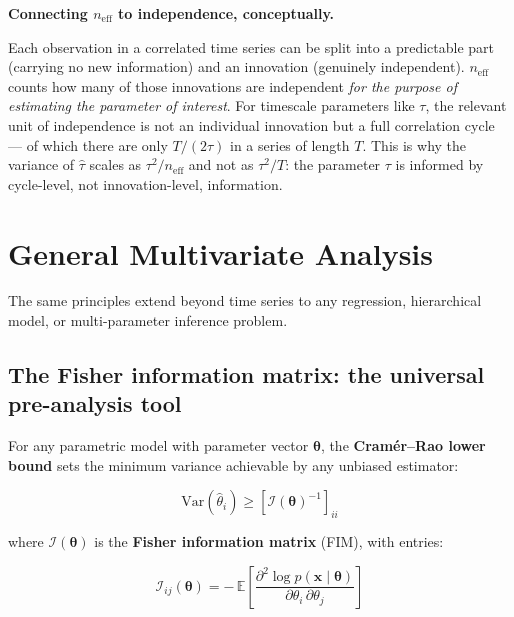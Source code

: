 \documentclass[11pt, a4paper]{article}
\begin{document}
\begin{keybox}
\textbf{Connecting $n_\mathrm{eff}$ to independence, conceptually.}

\smallskip
Each observation in a correlated time series can be split into a predictable part
(carrying no new information) and an innovation (genuinely independent).
$n_\mathrm{eff}$ counts how many of those innovations are independent \emph{for the
purpose of estimating the parameter of interest}.
For timescale parameters like $\tau$, the relevant unit of independence is not an
individual innovation but a full correlation cycle --- of which there are only
$T/(2\tau)$ in a series of length $T$.
This is why the variance of $\hat\tau$ scales as $\tau^2/n_\mathrm{eff}$ and not as
$\tau^2/T$: the parameter $\tau$ is informed by cycle-level, not
innovation-level, information.
\end{keybox}

\section{General Multivariate Analysis}

The same principles extend beyond time series to any regression, hierarchical model,
or multi-parameter inference problem.

\subsection{The Fisher information matrix: the universal pre-analysis tool}

For any parametric model with parameter vector $\boldsymbol{\theta}$, the
\textbf{Cram\'er--Rao lower bound} sets the minimum variance achievable by any
unbiased estimator:

\begin{equation}
    \mathrm{Var}(\hat{\theta}_i) \geq \left[\mathcal{I}(\boldsymbol{\theta})^{-1}\right]_{ii}
\end{equation}

where $\mathcal{I}(\boldsymbol{\theta})$ is the \textbf{Fisher information matrix}
(FIM), with entries:

\begin{equation}
    \mathcal{I}_{ij}(\boldsymbol{\theta}) = -\,\mathbb{E}\!\left[
        \frac{\partial^2 \log p(\mathbf{x} \mid \boldsymbol{\theta})}{\partial \theta_i \,\partial \theta_j}
    \right]
\end{equation}
\end{document}
